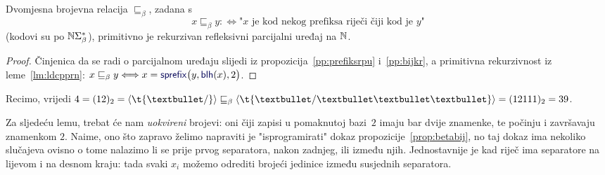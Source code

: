 \begin{korolar}[{name=[primitivna rekurzivnost relacije "biti prefiks"]}]\label{kor:preceqprnrpu}
Dvomjesna brojevna relacija $\sqsubseteq_\beta$, zadana s
\begin{equation}
    x\sqsubseteq_\beta y:\Longleftrightarrow\text{"$x$ je kod nekog prefiksa riječi čiji kod je $y$"}
\end{equation}
(kodovi su po ${\mathbb N}\Sigma_\beta^*$), primitivno je rekurzivan refleksivni parcijalni uređaj na ${\mathbb N}$.
\end{korolar}
\begin{proof}
Činjenica da se radi o parcijalnom uređaju slijedi iz propozicija~\ref{pp:prefiksrpu} i~\ref{pp:bijkr}, a
primitivna rekurzivnost iz leme~\ref{lm:ldcpprn}: $x\sqsubseteq_\beta y\Longleftrightarrow x=\f{sprefix}\bigl(y,\f{blh}(x),2\bigr)$.
\end{proof}

\begin{primjer}[{name=[prateća relacija "prefiks"]}]
Recimo, vrijedi $4=(12)_2=\kr{\t{\textbullet/}}\sqsubseteq_\beta\kr{\t{\textbullet/\textbullet\textbullet\textbullet}}=(12111)_2=39$.
\end{primjer}

Za sljedeću lemu, trebat će nam \emph{uokvireni} brojevi: oni čiji zapisi u pomaknutoj bazi~$2$ imaju bar dvije znamenke, te počinju i završavaju znamenkom $2$. Naime, ono što zapravo želimo napraviti je "isprogramirati" dokaz propozicije~\ref{prop:betabij}, no taj dokaz ima nekoliko slučajeva ovisno o tome nalazimo li se prije prvog separatora, nakon zadnjeg, ili između njih. Jednostavnije je kad riječ ima separatore na lijevom i na desnom kraju: tada svaki $x_i$ možemo odrediti brojeći jedinice između susjednih separatora.

